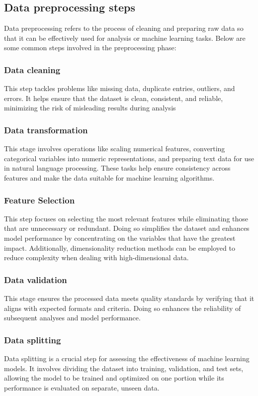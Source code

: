 \subsection{Data preprocessing steps}
Data preprocessing refers to the process of cleaning and preparing raw data so that it can be effectively used for analysis or machine learning tasks. Below are some common steps involved in the preprocessing phase:

\subsubsection*{Data cleaning}
This step tackles problems like missing data, duplicate entries, outliers, and errors. It helps ensure that the dataset is clean, consistent, and reliable, minimizing the risk of misleading results during analysis

\subsubsection*{Data transformation}
This stage involves operations like scaling numerical features, converting categorical variables into numeric representations, and preparing text data for use in natural language processing. These tasks help ensure consistency across features and make the data suitable for machine learning algorithms.

\subsubsection*{Feature Selection}
This step focuses on selecting the most relevant features while eliminating those that are unnecessary or redundant. Doing so simplifies the dataset and enhances model performance by concentrating on the variables that have the greatest impact. Additionally, dimensionality reduction methods can be employed to reduce complexity when dealing with high-dimensional data.
\subsubsection*{Data validation}
This stage ensures the processed data meets quality standards by verifying that it aligns with expected formats and criteria. Doing so enhances the reliability of subsequent analyses and model performance. 

\subsubsection*{Data splitting}
Data splitting is a crucial step for assessing the effectiveness of machine learning models. It involves dividing the dataset into training, validation, and test sets, allowing the model to be trained and optimized on one portion while its performance is evaluated on separate, unseen data.


